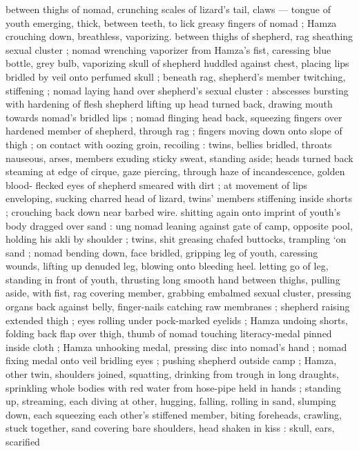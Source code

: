 between thighs of nomad, crunching scales of lizard's tail, claws --- 
tongue of youth emerging, thick, between teeth, to lick greasy 
fingers of nomad ; Hamza crouching down, breathless, vaporizing. 
between thighs of shepherd, rag sheathing sexual cluster ; nomad 
wrenching vaporizer from Hamza's fist, caressing blue bottle, grey 
bulb, vaporizing skull of shepherd huddled against chest, placing 
lips bridled by veil onto perfumed skull ; beneath rag, shepherd's 
member twitching, stiffening ; nomad laying hand over shepherd's 
sexual cluster : abscesses bursting with hardening of flesh 
shepherd lifting up head turned back, drawing mouth towards 
nomad's bridled lips ; nomad flinging head back, squeezing fingers 
over hardened member of shepherd, through rag ; fingers moving 
down onto slope of thigh ; on contact with oozing groin, recoiling : 
twins, bellies bridled, throats nauseous, arses, members exuding 
sticky sweat, standing aside; heads turned back steaming at edge of 
cirque, gaze piercing, through haze of incandescence, golden blood- 
flecked eyes of shepherd smeared with dirt ; at movement of lips 
enveloping, sucking charred head of lizard, twins' members 
stiffening inside shorts ; crouching back down near barbed wire. 
shitting again onto imprint of youth's body dragged over sand : 
ung nomad leaning against gate of camp, opposite pool, holding 
his akli by shoulder ; twins, shit greasing chafed buttocks, trampling 
‘on sand ; nomad bending down, face bridled, gripping leg of youth, 
caressing wounds, lifting up denuded leg, blowing onto bleeding 
heel. letting go of leg, standing in front of youth, thrusting long 
smooth hand between thighs, pulling aside, with fist, rag covering 
member, grabbing embalmed sexual cluster, pressing organs back 
against belly, finger-nails catching raw membranes ; shepherd raising 
extended thigh ; eyes rolling under pock-marked eyelids ; Hamza 
undoing shorts, folding back flap over thigh, thumb of nomad 
touching literacy-medal pinned inside cloth ; Hamza unhooking 
medal, pressing disc into nomad's hand ; nomad fixing medal onto 
veil bridling eyes ; pushing shepherd outside camp ; Hamza, other 
twin, shoulders joined, squatting, drinking from trough in long 
draughts, sprinkling whole bodies with red water from hose-pipe held 
in hands ; standing up, streaming, each diving at other, hugging, 
falling, rolling in sand, slumping down, each squeezing each other's 
stiffened member, biting foreheads, crawling, stuck together, sand 
covering bare shoulders, head shaken in kiss : skull, ears, scarified 
